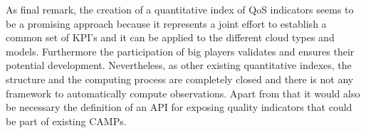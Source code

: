 As final remark, the creation of a quantitative index of QoS indicators seems to be a promising approach because 
it represents a joint effort to establish a common set of KPI's and it can be applied to the different cloud types and models. Furthermore 
the participation of big players validates and ensures their potential development. Nevertheless, as other existing quantitative indexes, 
the structure and the computing process are completely closed and there is not any framework to automatically compute observations. Apart from 
that it would also be necessary the definition of an API for exposing quality indicators that could be part of existing CAMPs.

% 
% 
